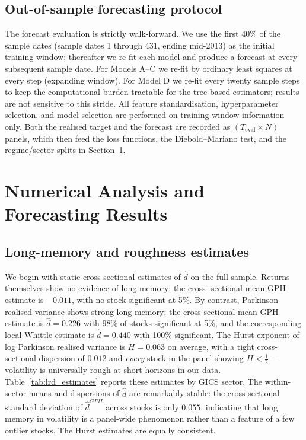 \documentclass[11pt,a4paper]{article}
\newcommand{\dhat}{\hat d}
\begin{document}


\subsection{Out-of-sample forecasting protocol}

The forecast evaluation is strictly walk-forward. We use the first 40\%
of the sample dates (sample dates 1 through 431, ending mid-2013) as the
initial training window; thereafter we re-fit each model and produce a
forecast at every subsequent sample date. For Models A--C we re-fit by
ordinary least squares at every step (expanding window). For Model D we
re-fit every twenty sample steps to keep the computational burden
tractable for the tree-based estimators; results are not sensitive to
this stride. All feature standardisation, hyperparameter selection, and
model selection are performed on training-window information only.
Both the realised target and the forecast are recorded as
$(T_{\mathrm{eval}}\!\times\!N)$ panels, which then feed the loss
functions, the Diebold--Mariano test, and the regime/sector splits in
Section~\ref{sec:results}.

\section{Numerical Analysis and Forecasting Results}
\label{sec:results}

\subsection{Long-memory and roughness estimates}

We begin with static cross-sectional estimates of $\dhat$ on the full
sample. Returns themselves show no evidence of long memory: the cross-
sectional mean GPH estimate is $-0.011$, with no stock significant at
5\%. By contrast, Parkinson realised variance shows strong long memory:
the cross-sectional mean GPH estimate is $\dhat = 0.226$ with 98\% of
stocks significant at 5\%, and the corresponding local-Whittle estimate
is $\dhat = 0.440$ with 100\% significant. The Hurst exponent of log
Parkinson realised variance is $H = 0.063$ on average, with a tight
cross-sectional dispersion of $0.012$ and \emph{every} stock in the
panel showing $H<\tfrac12$ --- volatility is universally rough at short
horizons in our data. Table~\ref{tab:lrd_estimates} reports these
estimates by GICS sector. The within-sector means and dispersions of
$\dhat$ are remarkably stable: the cross-sectional standard deviation of
$\dhat^{GPH}$ across stocks is only $0.055$, indicating that long memory
in volatility is a panel-wide phenomenon rather than a feature of a few
outlier stocks. The Hurst estimates are equally consistent.
\end{document}
